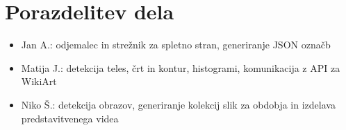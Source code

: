 \documentclass{article}
\begin{document}
	\section{Porazdelitev dela}
		\begin{itemize}
			\item Jan A.: odjemalec in strežnik za spletno stran, generiranje JSON označb
			\item Matija J.: detekcija teles, črt in kontur, histogrami, komunikacija z API za WikiArt
			\item Niko Š.: detekcija obrazov, generiranje kolekcij slik za obdobja in izdelava predstavitvenega videa
		\end{itemize}
\end{document}
